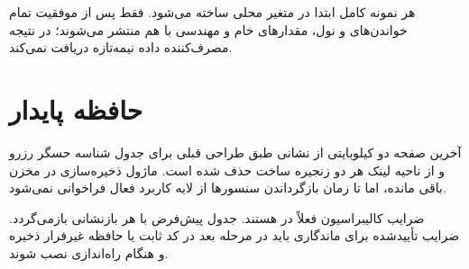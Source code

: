 هر نمونه کامل ابتدا در متغیر محلی ساخته می‌شود. فقط پس از موفقیت تمام خواندن‌های
و نول، مقدارهای خام و مهندسی با هم منتشر می‌شوند؛ در نتیجه مصرف‌کننده داده نیمه‌تازه دریافت نمی‌کند.

\section{حافظه پایدار}
آخرین صفحه دو کیلوبایتی
از نشانی
طبق طراحی قبلی برای جدول شناسه حسگر رزرو و از ناحیه لینک هر دو زنجیره ساخت حذف شده است. ماژول ذخیره‌سازی در مخزن باقی مانده، اما تا زمان بازگرداندن سنسورها از لایه کاربرد فعال فراخوانی نمی‌شود.

ضرایب کالیبراسیون
فعلاً در
هستند. جدول پیش‌فرض با هر بازنشانی بازمی‌گردد. ضرایب تأییدشده برای ماندگاری باید در مرحله بعد در کد ثابت یا حافظه غیرفرار ذخیره و هنگام راه‌اندازی نصب شوند.
